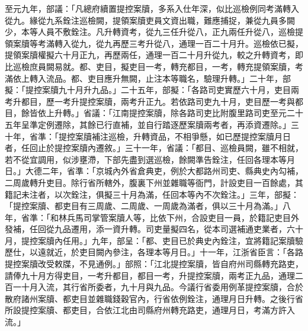\begin{pinyinscope}
 至元九年，部議：「凡總府續置提控案牘，多系入仕年深，似比巡檢例同考滿轉入從九。緣從九系銓注巡檢闕，提領案牘吏員文資出職，難應捕捉，兼從九員多闕少，本等人員不敷銓注。凡升轉資考，從九三任升從八，正九兩任升從八，巡檢提領案牘等考滿轉入從九，從九再歷三考升從八，通理一百二十月升。巡檢依已擬，提領案牘權擬六十月正九，再歷兩任，通理一百二十月升從九，較之升轉資考，即比巡檢庶員闕易就。都、吏目，擬吏目一考，轉充都目，一考，轉充提領案牘，考滿依上轉入流品。都、吏目應升無闕，止注本等職名，驗理升轉。」二十年，部擬：「提控案牘九十月升九品。」二十五年，部擬：「各路司吏實歷六十月，吏目兩考升都目，歷一考升提控案牘，兩考升正九。若依路司吏九十月，吏目歷一考與都目，餘皆依上升轉。」省議：「江南提控案牘，除各路司吏比附腹里路司吏至元二十五年呈準定例遷除，其餘已行直補，並自行踏逐歷案牘兩考者，再添資遷除。」三十年，省準：「提控案牘補注巡檢，升轉資品，不相爭懸，如已歷提控案牘月日者，任回止於提控案牘內遷敘。」三十一年，省議：「都目、巡檢員闕，雖不相就，若不從宜調用，似涉壅滯，下部先盡到選巡檢，餘闕準告銓注，任回各理本等月日。」大德二年，省準：「京城內外省倉典吏，例於大都路州司吏、縣典史內勾補，二周歲轉升吏目。除行省所轄外，腹裏下州並雜職等衙門，計設吏目一百餘處，其籍記未注者，以次銓注，俱擬三十月為滿，任回本等內不次銓注。」三年，部擬：「提控案牘、都吏目有三周歲、二周歲、一周歲為滿者，俱以三十月為滿。」八年，省準：「和林兵馬司掌管案牘人等，比依下州，合設吏目一員，於籍記吏目外發補，任回從九品遷用，添一資升轉。司吏量擬四名，從本司選補通吏業者，六十月，提控案牘內任用。」九年，部呈：「都、吏目已於典史內銓注，宜將籍記案牘驗歷仕，以遠就近，於吏目闕內參注，各理本等月日。」十一年，江浙省臣言：「各路提控案牘改受敕牒，不見通例。」部照：「江北提控案牘，皆自府州司縣轉充路吏，請俸九十月方得吏目，一考升都目，都目一考，升提控案牘，兩考正九品，通理二百一十月入流，其行省所委者，九十月與九品。今議行省委用例革提控案牘，合於散府諸州案牘、都吏目並雜職錢穀官內，行省依例銓注，通理月日升轉。之後行省所設提控案牘、都吏目，合依江北由司縣府州轉充路吏，通理月日，考滿方許入流。」




\end{pinyinscope}
